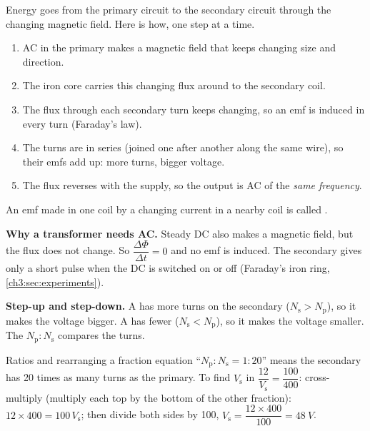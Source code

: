Energy goes from the primary circuit to the secondary circuit through the changing
magnetic field. Here is how, one step at a time.
\begin{enumerate}
  \item AC in the primary makes a magnetic field that keeps changing size and direction.
  \item The iron core carries this changing flux around to the secondary coil.
  \item The flux through each secondary turn keeps changing, so an emf is induced in
        every turn (Faraday's law).
  \item The turns are in series (joined one after another along the same wire), so
        their emfs add up: more turns, bigger voltage.
  \item The flux reverses with the supply, so the output is AC of the \emph{same
        frequency}.
\end{enumerate}
An emf made in one coil by a changing current in a nearby coil is called
.

\textbf{Why a transformer needs AC.} Steady DC also makes a magnetic field, but the flux
does not change. So $\dfrac{\Delta\Phi}{\Delta t} = 0$ and no emf is induced. The
secondary gives only a short pulse when the DC is switched on or off (Faraday's iron
ring, \cref{ch3:sec:experiments}).

\textbf{Step-up and step-down.} A  has more turns on the
secondary ($N_\mathrm{s} > N_\mathrm{p}$), so it makes the voltage bigger. A
 has fewer ($N_\mathrm{s} < N_\mathrm{p}$), so it makes the
voltage smaller. The  $N_\mathrm{p} : N_\mathrm{s}$ compares the turns.

\begin{toolkit}{Ratios and rearranging a fraction equation}
``$N_\mathrm{p} : N_\mathrm{s} = 1 : 20$'' means the secondary has 20 times as many turns
as the primary. To find $V_\mathrm{s}$ in $\dfrac{12}{V_\mathrm{s}} = \dfrac{100}{400}$:
cross-multiply (multiply each top by the bottom of the other fraction):
$12 \times 400 = 100\,V_\mathrm{s}$; then divide both sides by 100,
$V_\mathrm{s} = \dfrac{12 \times 400}{100} = \qty{48}{V}$.
\end{toolkit}

